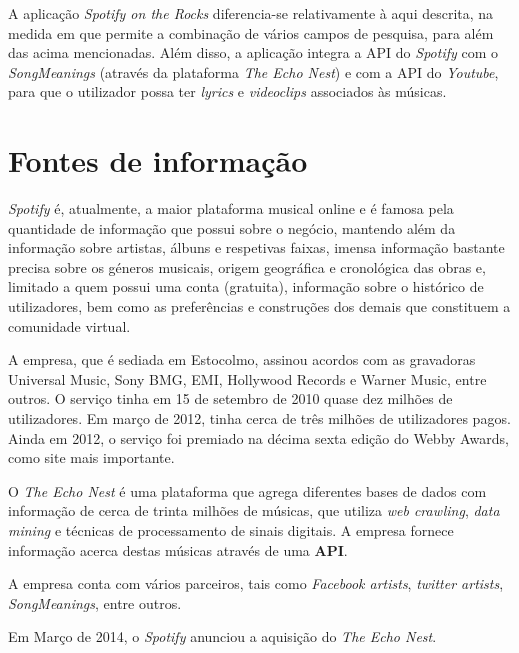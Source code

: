 \documentclass[twocolumn,twoside,11pt,a4paper]{article}
\begin{document}
A aplicação \textit{Spotify on the Rocks} diferencia-se relativamente à aqui descrita,
na medida em que permite a combinação de vários campos de pesquisa, para além das
acima mencionadas.
Além disso, a aplicação integra a API do \textit{Spotify} com o \textit{SongMeanings}
(através da plataforma \textit{The Echo Nest}) e com a API do
\textit{Youtube}, para que o utilizador possa ter \textit{lyrics} e \textit{videoclips}
associados às músicas. \\

\section{Fontes de informação}\label{sec:sources}

\textit{Spotify} \cite{wikispot} é, atualmente, a maior plataforma musical online e é famosa pela
quantidade de informação que possui sobre o negócio, mantendo além da informação
sobre artistas, álbuns e respetivas faixas, imensa informação bastante precisa sobre
os géneros musicais, origem geográfica e cronológica das obras e, limitado a quem
possui uma conta (gratuita), informação sobre o histórico de utilizadores, bem como as preferências e construções dos demais que constituem a comunidade virtual. 

A empresa, que é sediada em Estocolmo, assinou acordos com as gravadoras Universal
Music, Sony BMG, EMI, Hollywood Records e Warner Music, entre outros. O serviço tinha em
15 de setembro de 2010 quase dez milhões de utilizadores. Em março de 2012, tinha cerca
de três milhões de utilizadores pagos. Ainda em 2012, o serviço foi premiado na décima
sexta edição do Webby Awards, como site mais importante. 

\null

O \textit{The Echo Nest} \cite{wikiecho} é uma plataforma que agrega diferentes bases de dados com
informação de cerca de trinta milhões de músicas, que utiliza \textit{web crawling},
\textit{data mining} e técnicas de processamento de sinais digitais. A empresa fornece
informação acerca destas músicas através de uma \textbf{API}.

A empresa conta com vários parceiros, tais como \textit{Facebook artists},
\textit{twitter artists}, \textit{SongMeanings}, entre outros.

Em Março de 2014, o \textit{Spotify} anunciou a aquisição do \textit{The Echo Nest}.

\null
\end{document}
